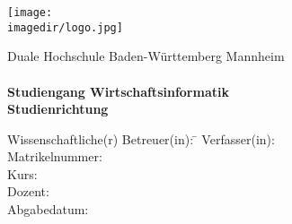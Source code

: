 \begin{titlepage}
\begin{minipage}{\textwidth}
		\vspace{-2cm}
		\hfill \texttt{[image: \\imagedir/logo.jpg]}
\end{minipage}
\vspace{1em}
\begin{center}
	{\textsf{\large Duale Hochschule Baden-W\"urttemberg Mannheim}}\\[4em]
	{\textsf{\textbf{\Large{}\DerTitelDerArbeit}}} \\[1.5cm]
	{\textsf{\textbf{\large{}Studiengang Wirtschaftsinformatik}}\\[6mm]
	\textsf{\textbf{Studienrichtung \DieStudienrichtung}}}\vspace{10em}
	
	\begin{minipage}{\textwidth}
		\begin{tabbing}
		Wissenschaftliche(r) Betreuer(in): \hspace{0.85cm}\=\kill
		Verfasser(in): \> \DerAutorDerArbeit \\[1.5mm]
		Matrikelnummer: \> \DieMatrikelnummer \\[1.5mm]
		Kurs: \> \DieKursbezeichnung \\[1.5mm]
		Dozent: \> \DerStudiengangsleiter \\[1.5mm]
		Abgabedatum: \> \DerBearbeitungszeitraum\\[1.5mm]
		\end{tabbing}
	\end{minipage}
\end{center}
\end{titlepage}